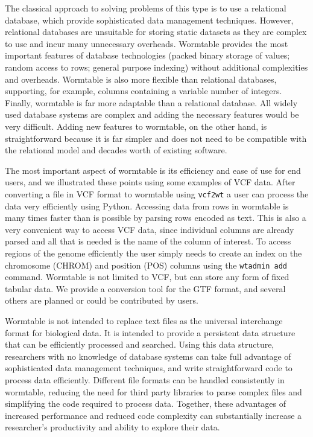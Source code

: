 \documentclass[10pt]{bmc_article}
\newenvironment{bmcformat}{\begin{raggedright}\baselineskip20pt\sloppy\setboolean{publ}{false}}{\end{raggedright}\baselineskip20pt\sloppy}
\begin{document}
\begin{bmcformat}
The classical approach to solving problems of this type 
is to use a relational database, which provide sophisticated 
data management techniques. However, relational databases are unsuitable 
for storing static datasets as they are complex to 
use and incur many unnecessary overheads.
Wormtable provides the most important features of database
technologies (packed binary storage of values; random access 
to rows; general purpose indexing) without additional complexities 
and overheads. Wormtable is also more flexible than 
relational databases, supporting, for example, columns 
containing a variable number of integers. Finally, wormtable 
is far more adaptable than a relational database.
All widely used database systems are complex 
and adding the necessary features would be 
very difficult. Adding new features to wormtable, on the 
other hand, is straightforward because it is far simpler and 
does not need to be compatible with the relational model
and decades worth of existing software.

The most important aspect of wormtable is its efficiency
and ease of use for end users, and we illustrated these
points using some examples of VCF data.
After converting a file in VCF format to 
wormtable using \texttt{vcf2wt} a user can process the 
data very efficiently using Python. Accessing data from 
rows in wormtable is many times faster than is possible 
by parsing rows encoded as text.
This is also a very convenient 
way to access VCF data, since individual columns are already 
parsed and all that is needed is the name of the column of 
interest. To access regions of the genome efficiently
the user simply needs to create an index on the chromosome 
(CHROM) and position (POS) columns
using the  \texttt{wtadmin add} command. Wormtable is not 
limited to VCF, but can store 
any form of fixed tabular data. We provide a conversion 
tool for the GTF format, and several others are planned or 
could be contributed by users.

Wormtable is not intended to replace text files as the universal 
interchange format for biological data. 
It is intended to provide a persistent data structure 
that can be efficiently processed 
and searched. Using this data structure, researchers with no knowledge of 
database systems can take full advantage of sophisticated 
data management techniques, and write straightforward code to process 
data efficiently. 
Different file formats can be handled consistently 
in wormtable, reducing the need for third party libraries 
to parse complex files and simplifying the code required 
to process data.
Together, these advantages of increased performance and reduced 
code complexity can substantially increase a researcher's 
productivity and ability to explore their data.



\end{bmcformat}
\end{document}
